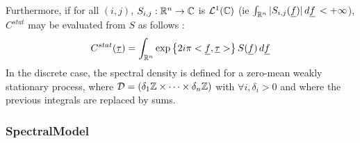 Furthermore, if for all $(i,j)$, $S_{i,j}: {\mathbb R}^n \rightarrow {\mathbb C}$ is ${\mathcal L}^1({\mathbb C})$ (ie $\int_{{\mathbb R}^n} |S_{i,j}({\underline{f}})|\, d{\underline{f}}\, < +\infty$), $C^{stat}$ may be evaluated from $S$ as follows :
\begin{equation} \label{cspectransform}
C^{stat}({\underline{\tau}})  = \int_{{\mathbb R}^n}\exp\left\{  2i\pi <{\underline{f}}, {\underline{\tau}}> \right\}S({\underline{f}})\, d{\underline{f}}
\end{equation}
In the discrete case, the spectral density is defined for a zero-mean weakly stationary process, where ${\mathcal D}=(\delta_1 {\mathbb Z} \times \dots \times \delta_n {\mathbb Z})$ with $\forall i, \delta_i >0$ and where the previous integrals are replaced by sums.




\newpage
\subsubsection{SpectralModel}

